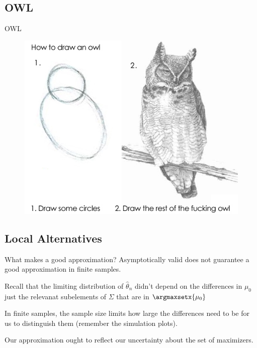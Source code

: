 \documentclass[aspectratio=169, professionalfonts]{beamer}
\begin{document}
\subsection{OWL}
\begin{frame}{OWL}
	\begin{figure}
		\includegraphics[width=.6\textwidth]{figures/how-to-draw-an-owl}
	\end{figure}
\end{frame}









\subsection{Local Alternatives}
\begin{frame}{What makes a good approximation?}
	Asymptotically valid does not guarantee a good approximation in finite
	samples.

	\vfill


	Recall that the limiting distribution of $\widehat{\theta}_n$ didn't depend on
	the differences in $\mu_0$ just the relevanat subelements of $\Sigma$ that are in $\argmaxsetx{\mu_0}$


	\vfill
	In finite samples, the sample size limits how large the differences
	need to be for us to distinguish them (remember the simulation plots).

	\vfill

	Our approximation ought to reflect our uncertainty about the set
	of 	maximizers.

\end{frame}
\end{document}
